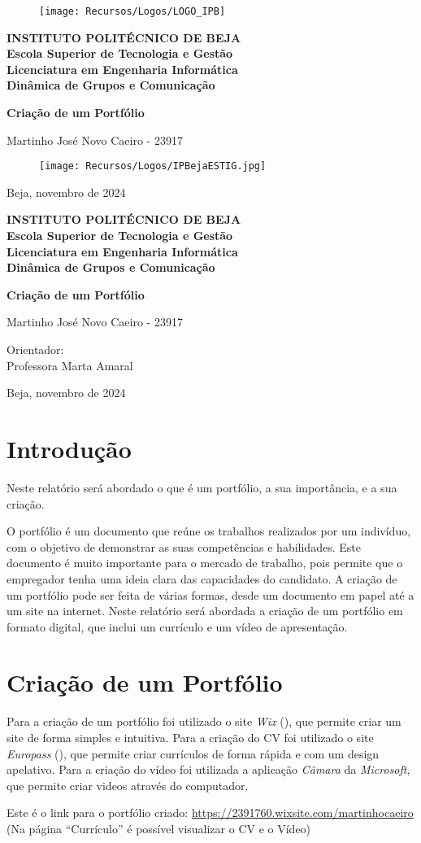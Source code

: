 \documentclass[a4paper]{article}
\newcommand{\firsttitlepage}{
    \begin{titlepage}
        \centering
        \vspace*{1cm}
        
        \begin{figure}[h!]
            \centering
            \texttt{[image: Recursos/Logos/LOGO\_IPB]} %
            \vspace{0.5cm}
        \end{figure}

        \large\textbf{INSTITUTO POLITÉCNICO DE BEJA} \\
        \large\textbf{Escola Superior de Tecnologia e Gestão} \\
        \large\textbf{Licenciatura em Engenharia Informática} \\
        \large\textbf{Dinâmica de Grupos e Comunicação} \\
        
        \vspace{2cm}
        
        {\Huge \textbf{Criação de um Portfólio}} \\
        
        \vspace{1.5cm}
        
        \large Martinho José Novo Caeiro - 23917 \\
        
        \vfill
        
        \begin{figure}[h!]
            \centering
            \texttt{[image: Recursos/Logos/IPBejaESTIG.jpg]} %
        \end{figure}
        
        \vspace{1cm}
        
        {\large Beja, novembro de 2024}
    \end{titlepage}
}
\newcommand{\secondtitlepage}{
    \begin{titlepage}
        \centering
        \vspace*{1cm}
        
        \large\textbf{INSTITUTO POLITÉCNICO DE BEJA} \\
        \large\textbf{Escola Superior de Tecnologia e Gestão} \\
        \large\textbf{Licenciatura em Engenharia Informática} \\
        \large\textbf{Dinâmica de Grupos e Comunicação} \\
        
        \vspace{2cm}
        
        {\Huge \textbf{Criação de um Portfólio}} \\
        
        \vspace{1.5cm}
        
        \large Martinho José Novo Caeiro - 23917 \\

        \vspace{2cm}

        \large Orientador:\\ Professora Marta Amaral
        
        \vfill
        
        {\large Beja, novembro de 2024}
    \end{titlepage}
}
\begin{document}


\firsttitlepage


\secondtitlepage


\newpage

\renewcommand{\contentsname}{Indíce}
\renewcommand{\refname}{Webgrafia}
\renewcommand{\thefigure}{\thesection.\arabic{figure}}

\newpage
{}
\doublespacing
\tableofcontents
\doublespacing

\newpage
{}

\section{Introdução}\label{intro}
Neste relatório será abordado o que é um portfólio, a sua importância, e a sua criação.

O portfólio é um documento que reúne os trabalhos realizados por um indivíduo, com o objetivo de demonstrar as suas competências e habilidades. 
Este documento é muito importante para o mercado de trabalho, pois permite que o empregador tenha uma ideia clara das capacidades do candidato. 
A criação de um portfólio pode ser feita de várias formas, desde um documento em papel até a um site na internet. 
Neste relatório será abordada a criação de um portfólio em formato digital, que inclui um currículo e um vídeo de apresentação.

\newpage
\section{Criação de um Portfólio}\label{criacao}
Para a criação de um portfólio foi utilizado o site \textit{Wix} (\cite{wix}), que permite criar um site de forma simples e intuitiva.
Para a criação do CV foi utilizado o site \textit{Europass} (\cite{europass}), que permite criar currículos de forma rápida e com um design apelativo.
Para a criação do vídeo foi utilizada a aplicação \textit{Câmara} da \textit{Microsoft}, que permite criar videos através do computador.

Este é o link para o portfólio criado: \url{https://2391760.wixsite.com/martinhocaeiro} (Na página “Currículo” é possível visualizar o CV e o Vídeo)
\end{document}
